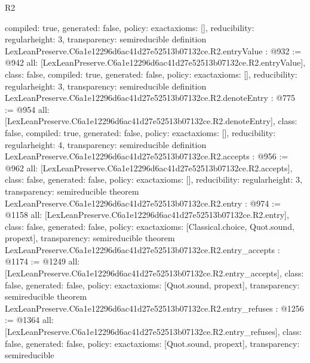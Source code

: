 \begin{lexlean}{R2}
\begin{coremodule}
{  compiled: true,
  generated: false,
  policy: exact{axioms: []},
  reducibility: regular{height: 3},
  transparency: semireducible
}
definition LexLeanPreserve.C6a1e12296d6ac41d27e52513b07132ce.R2.entryValue : @932 := @942 {
  all: [LexLeanPreserve.C6a1e12296d6ac41d27e52513b07132ce.R2.entryValue],
  class: false,
  compiled: true,
  generated: false,
  policy: exact{axioms: []},
  reducibility: regular{height: 3},
  transparency: semireducible
}
definition LexLeanPreserve.C6a1e12296d6ac41d27e52513b07132ce.R2.denoteEntry : @775 := @954 {
  all: [LexLeanPreserve.C6a1e12296d6ac41d27e52513b07132ce.R2.denoteEntry],
  class: false,
  compiled: true,
  generated: false,
  policy: exact{axioms: []},
  reducibility: regular{height: 4},
  transparency: semireducible
}
definition LexLeanPreserve.C6a1e12296d6ac41d27e52513b07132ce.R2.accepts : @956 := @962 {
  all: [LexLeanPreserve.C6a1e12296d6ac41d27e52513b07132ce.R2.accepts],
  class: false,
  generated: false,
  policy: exact{axioms: []},
  reducibility: regular{height: 3},
  transparency: semireducible
}
theorem LexLeanPreserve.C6a1e12296d6ac41d27e52513b07132ce.R2.entry : @974 := @1158 {
  all: [LexLeanPreserve.C6a1e12296d6ac41d27e52513b07132ce.R2.entry],
  class: false,
  generated: false,
  policy: exact{axioms: [Classical.choice, Quot.sound, propext]},
  transparency: semireducible
}
theorem LexLeanPreserve.C6a1e12296d6ac41d27e52513b07132ce.R2.entry_accepts : @1174 := @1249 {
  all: [LexLeanPreserve.C6a1e12296d6ac41d27e52513b07132ce.R2.entry_accepts],
  class: false,
  generated: false,
  policy: exact{axioms: [Quot.sound, propext]},
  transparency: semireducible
}
theorem LexLeanPreserve.C6a1e12296d6ac41d27e52513b07132ce.R2.entry_refuses : @1256 := @1364 {
  all: [LexLeanPreserve.C6a1e12296d6ac41d27e52513b07132ce.R2.entry_refuses],
  class: false,
  generated: false,
  policy: exact{axioms: [Quot.sound, propext]},
  transparency: semireducible
}


\end{coremodule}
\end{lexlean}
